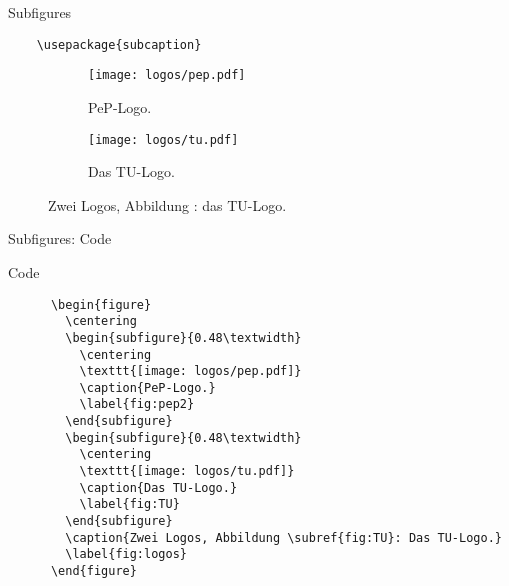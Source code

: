 \begin{frame}[fragile]{
  Subfigures
  \hfill
}
  \begin{Packages}
    \begin{lstlisting}
    \usepackage{subcaption}
    \end{lstlisting}
  \end{Packages}
  \begin{EmulateArticle}
    \begin{figure}
      \centering
      \begin{subfigure}{0.48\textwidth}
        \centering
        \texttt{[image: logos/pep.pdf]}
        \caption{PeP-Logo.}
        \label{fig:pep2}
      \end{subfigure}
      \begin{subfigure}{0.48\textwidth}
        \centering
        \texttt{[image: logos/tu.pdf]}
        \caption{Das TU-Logo.}
        \label{fig:TU}
      \end{subfigure}
      \caption{Zwei Logos, Abbildung : das TU-Logo.}\label{fig:logos}
    \end{figure}
  \end{EmulateArticle}
\end{frame}

\begin{frame}[fragile]{Subfigures: Code}
  \vspace{-3pt}
  \begin{block}{Code}
    \begin{lstlisting}
      \begin{figure}
        \centering
        \begin{subfigure}{0.48\textwidth}
          \centering
          \texttt{[image: logos/pep.pdf]}
          \caption{PeP-Logo.}
          \label{fig:pep2}
        \end{subfigure}
        \begin{subfigure}{0.48\textwidth}
          \centering
          \texttt{[image: logos/tu.pdf]}
          \caption{Das TU-Logo.}
          \label{fig:TU}
        \end{subfigure}
        \caption{Zwei Logos, Abbildung \subref{fig:TU}: Das TU-Logo.}
        \label{fig:logos}
      \end{figure}
    \end{lstlisting}
  \end{block}
\end{frame}

